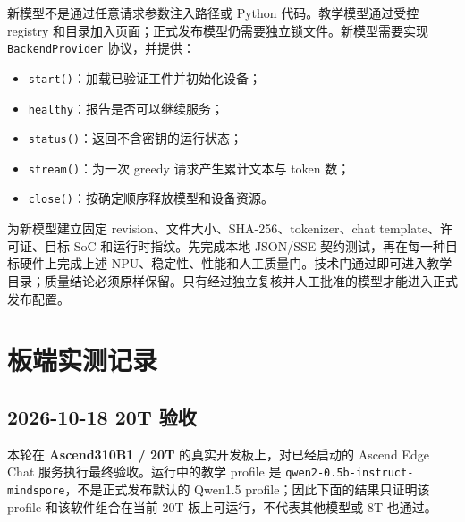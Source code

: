 新模型不是通过任意请求参数注入路径或 Python 代码。教学模型通过受控
registry 和目录加入页面；正式发布模型仍需要独立锁文件。新模型需要实现
\passthrough{\lstinline!BackendProvider!} 协议，并提供：

\begin{itemize}
\tightlist
\item
  \passthrough{\lstinline!start()!}：加载已验证工件并初始化设备；
\item
  \passthrough{\lstinline!healthy!}：报告是否可以继续服务；
\item
  \passthrough{\lstinline!status()!}：返回不含密钥的运行状态；
\item
  \passthrough{\lstinline!stream()!}：为一次 greedy 请求产生累计文本与
  token 数；
\item
  \passthrough{\lstinline!close()!}：按确定顺序释放模型和设备资源。
\end{itemize}

为新模型建立固定 revision、文件大小、SHA-256、tokenizer、chat
template、许可证、目标 SoC 和运行时指纹。先完成本地 JSON/SSE
契约测试，再在每一种目标硬件上完成上述
NPU、稳定性、性能和人工质量门。技术门通过即可进入教学目录；质量结论必须原样保留。只有经过独立复核并人工批准的模型才能进入正式发布配置。

\section{板端实测记录}\label{src-experiment-case9-board-evidence}

\subsection{2026-10-18 20T 验收}\label{t-ux9a8cux6536}

本轮在 \textbf{Ascend310B1 / 20T} 的真实开发板上，对已经启动的 Ascend
Edge Chat 服务执行最终验收。运行中的教学 profile 是
\passthrough{\lstinline!qwen2-0.5b-instruct-mindspore!}，不是正式发布默认的
Qwen1.5 profile；因此下面的结果只证明该 profile 和该软件组合在当前 20T
板上可运行，不代表其他模型或 8T 也通过。

